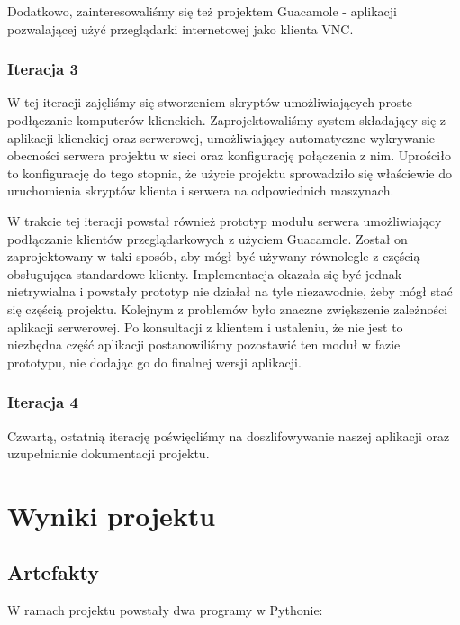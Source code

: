       Dodatkowo, zainteresowaliśmy się też projektem Guacamole \cite{Guacamole} - aplikacji pozwalającej użyć przeglądarki internetowej jako klienta VNC.

    \subsubsection{Iteracja 3}

      W tej iteracji zajęliśmy się stworzeniem skryptów umożliwiających proste podłączanie komputerów klienckich. Zaprojektowaliśmy system składający się z aplikacji klienckiej oraz serwerowej, umożliwiający automatyczne wykrywanie obecności serwera projektu w sieci oraz konfigurację połączenia z nim. Uprościło to konfigurację do tego stopnia, że użycie projektu sprowadziło się właściewie do uruchomienia skryptów klienta i serwera na odpowiednich maszynach.

    W trakcie tej iteracji powstał również prototyp modułu serwera umożliwiający podłączanie klientów przeglądarkowych z użyciem Guacamole. Został on zaprojektowany w taki sposób, aby mógł być używany równolegle z częścią obsługująca standardowe  klienty. Implementacja okazała się być jednak nietrywialna i powstały prototyp nie działał na tyle niezawodnie, żeby mógł stać się częścią projektu. Kolejnym z problemów było znaczne zwiększenie zależności aplikacji serwerowej. Po konsultacji z klientem i ustaleniu, że nie jest to niezbędna część aplikacji postanowiliśmy pozostawić ten moduł w fazie prototypu, nie dodając go do finalnej wersji aplikacji.

    \subsubsection{Iteracja 4}
      Czwartą, ostatnią iterację poświęcliśmy na doszlifowywanie naszej aplikacji oraz uzupełnianie dokumentacji projektu.

\section{Wyniki projektu}

  \subsection{Artefakty}

    W ramach projektu powstały dwa programy w Pythonie:

    \vspace{3mm}


